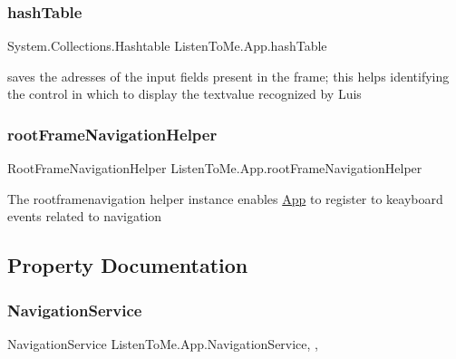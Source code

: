 \subsubsection{\texorpdfstring{hash\+Table}{hashTable}}
{\footnotesize\ttfamily System.\+Collections.\+Hashtable Listen\+To\+Me.\+App.\+hash\+Table\hspace{0.3cm}{\ttfamily [static]}}



saves the adresses of the input fields present in the frame; this helps identifying the control in which to display the textvalue recognized by Luis 

\mbox{\label{class_listen_to_me_1_1_app_a92eb573f880ce92d5b9fa79b90ba3f41}} 
\subsubsection{\texorpdfstring{root\+Frame\+Navigation\+Helper}{rootFrameNavigationHelper}}
{\footnotesize\ttfamily Root\+Frame\+Navigation\+Helper Listen\+To\+Me.\+App.\+root\+Frame\+Navigation\+Helper\hspace{0.3cm}{\ttfamily [private]}}



The rootframenavigation helper instance enables \mbox{\hyperlink{class_listen_to_me_1_1_app}{App}} to register to keayboard events related to navigation 



\subsection{Property Documentation}
\mbox{\label{class_listen_to_me_1_1_app_ae35ddc10bf8aad1a80c92c71c6e3b7fc}} 
\subsubsection{\texorpdfstring{Navigation\+Service}{NavigationService}}
{\footnotesize\ttfamily Navigation\+Service Listen\+To\+Me.\+App.\+Navigation\+Service\hspace{0.3cm}{\ttfamily [static]}, {\ttfamily [get]}, {}}



